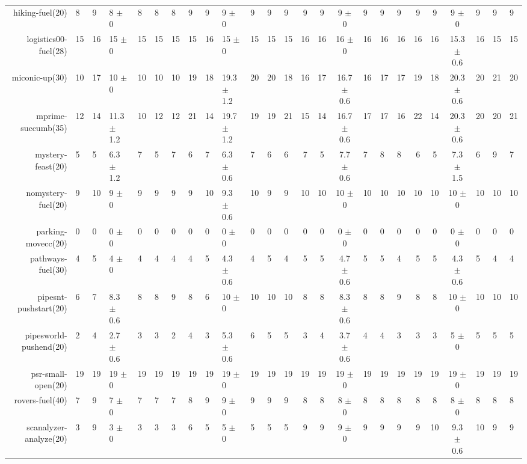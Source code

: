 \begin{center}
\begin{tabular}{|rHHHHHHHHHHHHcccHHH|cccHHH|}
hiking-fuel(20) & 8 & 9 & 8 \(\pm\) 0 & 8 & 8 & 8 & 9 & 9 & 9 \(\pm\) 0 & 9 & 9 & 9 & 9 & 9 & 9 \(\pm\) 0 & 9 & 9 & 9 & 9 & 9 & 9 \(\pm\) 0 & 9 & 9 & 9\\
logistics00-fuel(28) & 15 & 16 & 15 \(\pm\) 0 & 15 & 15 & 15 & 15 & 16 & 15 \(\pm\) 0 & 15 & 15 & 15 & 16 & 16 & 16 \(\pm\) 0 & 16 & 16 & 16 & 16 & 16 & 15.3 \(\pm\) 0.6 & 16 & 15 & 15\\
miconic-up(30) & 10 & 17 & 10 \(\pm\) 0 & 10 & 10 & 10 & 19 & 18 & 19.3 \(\pm\) 1.2 & 20 & 20 & 18 & 16 & 17 & 16.7 \(\pm\) 0.6 & 16 & 17 & 17 & 19 & 18 & 20.3 \(\pm\) 0.6 & 20 & 21 & 20\\
mprime-succumb(35) & 12 & 14 & 11.3 \(\pm\) 1.2 & 10 & 12 & 12 & 21 & 14 & 19.7 \(\pm\) 1.2 & 19 & 19 & 21 & 15 & 14 & 16.7 \(\pm\) 0.6 & 17 & 17 & 16 & 22 & 14 & 20.3 \(\pm\) 0.6 & 20 & 20 & 21\\
mystery-feast(20) & 5 & 5 & 6.3 \(\pm\) 1.2 & 7 & 5 & 7 & 6 & 7 & 6.3 \(\pm\) 0.6 & 7 & 6 & 6 & 7 & 5 & 7.7 \(\pm\) 0.6 & 7 & 8 & 8 & 6 & 5 & 7.3 \(\pm\) 1.5 & 6 & 9 & 7\\
nomystery-fuel(20) & 9 & 10 & 9 \(\pm\) 0 & 9 & 9 & 9 & 9 & 10 & 9.3 \(\pm\) 0.6 & 10 & 9 & 9 & 10 & 10 & 10 \(\pm\) 0 & 10 & 10 & 10 & 10 & 10 & 10 \(\pm\) 0 & 10 & 10 & 10\\
parking-movecc(20) & 0 & 0 & 0 \(\pm\) 0 & 0 & 0 & 0 & 0 & 0 & 0 \(\pm\) 0 & 0 & 0 & 0 & 0 & 0 & 0 \(\pm\) 0 & 0 & 0 & 0 & 0 & 0 & 0 \(\pm\) 0 & 0 & 0 & 0\\
pathways-fuel(30) & 4 & 5 & 4 \(\pm\) 0 & 4 & 4 & 4 & 4 & 5 & 4.3 \(\pm\) 0.6 & 4 & 5 & 4 & 5 & 5 & 4.7 \(\pm\) 0.6 & 5 & 5 & 4 & 5 & 5 & 4.3 \(\pm\) 0.6 & 5 & 4 & 4\\
pipesnt-pushstart(20) & 6 & 7 & 8.3 \(\pm\) 0.6 & 8 & 8 & 9 & 8 & 6 & 10 \(\pm\) 0 & 10 & 10 & 10 & 8 & 8 & 8.3 \(\pm\) 0.6 & 8 & 8 & 9 & 8 & 8 & 10 \(\pm\) 0 & 10 & 10 & 10\\
pipesworld-pushend(20) & 2 & 4 & 2.7 \(\pm\) 0.6 & 3 & 3 & 2 & 4 & 3 & 5.3 \(\pm\) 0.6 & 6 & 5 & 5 & 3 & 4 & 3.7 \(\pm\) 0.6 & 4 & 4 & 3 & 3 & 3 & 5 \(\pm\) 0 & 5 & 5 & 5\\
psr-small-open(20) & 19 & 19 & 19 \(\pm\) 0 & 19 & 19 & 19 & 19 & 19 & 19 \(\pm\) 0 & 19 & 19 & 19 & 19 & 19 & 19 \(\pm\) 0 & 19 & 19 & 19 & 19 & 19 & 19 \(\pm\) 0 & 19 & 19 & 19\\
rovers-fuel(40) & 7 & 9 & 7 \(\pm\) 0 & 7 & 7 & 7 & 8 & 9 & 9 \(\pm\) 0 & 9 & 9 & 9 & 8 & 8 & 8 \(\pm\) 0 & 8 & 8 & 8 & 8 & 8 & 8 \(\pm\) 0 & 8 & 8 & 8\\
scanalyzer-analyze(20) & 3 & 9 & 3 \(\pm\) 0 & 3 & 3 & 3 & 6 & 5 & 5 \(\pm\) 0 & 5 & 5 & 5 & 9 & 9 & 9 \(\pm\) 0 & 9 & 9 & 9 & 9 & 10 & 9.3 \(\pm\) 0.6 & 10 & 9 & 9\\

\end{tabular}
\end{center}
